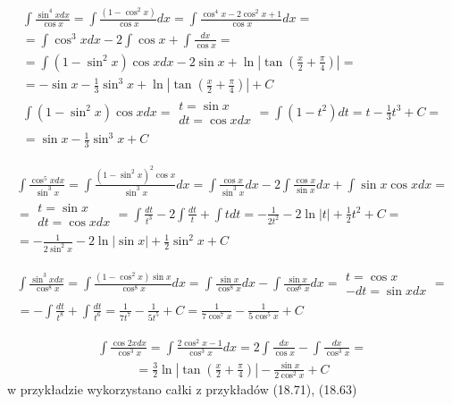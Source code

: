 \begin{gather*}\int \frac{\sin^4 x dx}{\cos x} = \int \frac{(1-\cos^2 x)}{\cos x}dx = \int \frac{\cos^4x-2\cos^2 x+1}{\cos x}dx =  \\
= \int \cos^3x dx -2 \int \cos x+\int \frac{dx}{\cos x} =  \\
= \int (1-\sin^2x)\cos xdx-2\sin x+\ln|\tan (\frac{x}{2}+\frac{\pi}{4})| =  \\
= -\sin x-\frac{1}{3}\sin^3 x+\ln|\tan (\frac{x}{2}+\frac{\pi}{4})|+C \\
\int (1-\sin^2x)\cos xdx = \begin{array}{|l|} t=\sin x \\ dt=\cos x dx \end{array} = \int (1-t^2)dt = t-\frac{1}{3}t^3+C =  \\
=\sin x-\frac{1}{3}\sin^3 x+C\end{gather*}



\begin{gather*}\int \frac{\cos^5 x dx}{\sin^3 x} = \int \frac{(1-\sin^2x)^2\cos x}{\sin^3 x}dx = \int \frac{\cos x}{\sin^3 x}dx-2\int \frac{\cos x}{\sin x}dx+\int \sin x\cos x dx =  \\
= \begin{array}{|l|} t=\sin x \\ dt=\cos x dx \end{array} = \int \frac{dt}{t^3}-2\int \frac{dt}{t}+\int tdt = -\frac{1}{2t^2}-2\ln|t|+\frac{1}{2}t^2+C =  \\
= -\frac{1}{2\sin^2 x}-2\ln|\sin x|+\frac{1}{2}\sin^2 x+C\end{gather*}



\begin{gather*}\int \frac{\sin^3 x dx}{\cos^8 x} = \int \frac{(1-\cos^2 x)\sin x}{\cos^8 x}dx = \int \frac{\sin x}{\cos^8x}dx - \int \frac{\sin x}{\cos^6x}dx = \begin{array}{|l|} t=\cos x \\ -dt=\sin x dx \end{array} =  \\
= -\int \frac{dt}{t^8}+\int \frac{dt}{t^6} = \frac{1}{7t^7}-\frac{1}{5t^5}+C = \frac{1}{7\cos^7x}-\frac{1}{5\cos^5x}+C\end{gather*}



\begin{gather*}\int \frac{\cos 2x dx}{\cos^3 x} = \int \frac{2\cos^2x-1}{\cos^3x}dx = 2\int \frac{dx}{\cos x}-\int \frac{dx}{\cos^3 x} = \end{gather*}
 \begin{gather*}= \frac{3}{2}\ln|\tan (\frac{x}{2}+\frac{\pi}{4})|-\frac{\sin x}{2\cos^2 x}+C\end{gather*}
w przykładzie wykorzystano całki z przykładów (18.71), (18.63)

